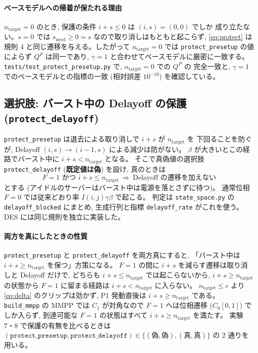 \documentclass[a4paper,11pt]{article}
\newcommand{\code}[1]{\texttt{#1}}
\begin{document}
\paragraph{ベースモデルへの帰着が保たれる理由}
$n_{\mathrm{target}}=0$ のとき, 保護の条件 $i+s\le 0$ は $(i,s)=(0,0)$ でしか
成り立たない。$s=0$ では $s_{\mathrm{need}}\ge0=s$ なので取り消しはもともと起こらず,
\eqref{eq:protect} は規則 4 と同じ遷移を与える。したがって
$n_{\mathrm{target}}=0$ では \code{protect\_presetup} の値によらず
$Q^P$ は同一であり, $\gamma=1$ と合わせてベースモデルに厳密に一致する。
\code{tests/test\_protect\_presetup.py} で, $n_{\mathrm{target}}=0$ での $Q^P$ の
完全一致と, $\gamma=1$ でのベースモデルとの指標の一致 (相対誤差 $10^{-10}$) を確認している。

\subsection{選択肢: バースト中の Delayoff の保護 (\code{protect\_delayoff})}
\label{sec:protect-delayoff}

\code{protect\_presetup} は退去による取り消しで $i+s$ が $n_{\mathrm{target}}$ を
下回ることを防ぐが, Delayoff $(i,s)\to(i-1,s)$ による減少は防がない。
$\beta$ が大きいとこの経路でバースト中に $i+s<n_{\mathrm{target}}$ となる。
そこで真偽値の選択肢 \code{protect\_delayoff} (\textbf{既定値は偽}) を設け,
真のときは
\begin{equation}
  F=1 \text{ かつ } i+s\le n_{\mathrm{target}}
  \ \Longrightarrow\ \text{Delayoff の遷移を加えない}
  \label{eq:protect-delayoff}
\end{equation}
とする (アイドルのサーバーはバースト中は電源を落とさずに待つ)。
通常位相 $F=0$ では従来どおり率 $I(i,j)\gamma\beta$ で起こる。
判定は \code{state\_space.py} の \code{delayoff\_blocked} にまとめ,
生成行列と指標 \code{delayoff\_rate} がこれを使う。DES には同じ規則を独立に実装した。

\paragraph{両方を真にしたときの性質}
\code{protect\_presetup} と \code{protect\_delayoff} を両方真にすると,
「バースト中は $i+s\ge n_{\mathrm{target}}$ を保つ」方策になる。
$F=1$ の間に $i+s$ を減らす遷移は取り消しと Delayoff だけで, どちらも
$i+s\le n_{\mathrm{target}}$ では起こらないから, $i+s\ge n_{\mathrm{target}}$ の状態から
$F=1$ に留まる経路は $i+s<n_{\mathrm{target}}$ に入らない。
$n_{\mathrm{target}}\le c$ より \eqref{eq:delta} のクリップは効かず,
P1 発動直後は $i+s\ge n_{\mathrm{target}}$ である。\code{build\_mmpp} の MMPP では
$C_1$ が対角なので $F=1$ へは位相遷移 ($C_0[0,1]$) でしか入らず,
到達可能な $F=1$ の状態はすべて $i+s\ge n_{\mathrm{target}}$ を満たす。
実験 7・8 で保護の有無を比べるときは
$(\code{protect\_presetup},\code{protect\_delayoff})\in\{(\text{偽},\text{偽}),(\text{真},\text{真})\}$
の 2 通りを用いる。
\end{document}
